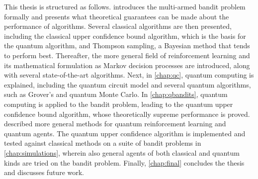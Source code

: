 This thesis is structured as follows.
 introduces the multi-armed bandit problem formally and presents what theoretical guarantees can be made about the performance of algorithms.
Several classical algorithms are then presented, including the classical upper confidence bound algorithm, which is the basis for the quantum algorithm, and Thompson sampling, a Bayesian method that tends to perform best.
Thereafter, the more general field of reinforcement learning and its mathematical formulation as Markov decision processes are introduced, along with several state-of-the-art algorithms.
Next, in \cref{chap:qc}, quantum computing is explained, including the quantum circuit model and several quantum algorithms, such as Grover's and quantum Monte Carlo.
In \cref{chap:qbandits}, quantum computing is applied to the bandit problem, leading to the quantum upper confidence bound algorithm, whose theoretically supreme performance is proved.
 described more general methods for quantum reinforcement learning and quantum agents.
The quantum upper confidence algorithm is implemented and tested against classical methods on a suite of bandit problems in \cref{chap:simulations}, wherein also general agents of both classical and quantum kinds are tried on the bandit problem.
Finally, \cref{chap:final} concludes the thesis and discusses future work.